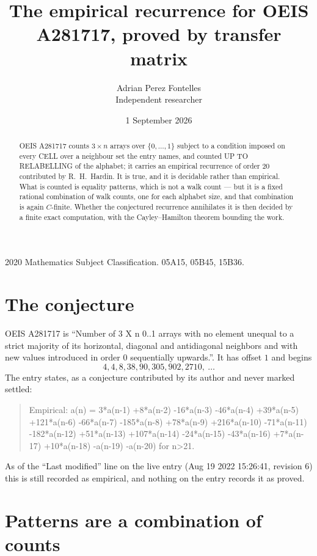 \documentclass[11pt,a4paper]{article}
\title{The empirical recurrence for OEIS A281717, proved by transfer matrix}
\author{Adrian Perez Fontelles\\ \small Independent researcher}
\date{1 September 2026}
\theoremstyle{plain}
\theoremstyle{definition}
\begin{document}
\maketitle

\begin{abstract}
OEIS A281717 counts $3\times n$ arrays over $\{0,\dots,1\}$ subject to a condition imposed on
every CELL over a neighbour set the entry names, and counted UP TO RELABELLING of the
alphabet; it carries an empirical recurrence of order $20$ contributed by
R.~H.~Hardin. It is true, and it is decidable rather than empirical. What is counted is
equality patterns, which is not a walk count --- but it is a fixed rational combination of
walk counts, one for each alphabet size, and that combination is again $C$-finite. Whether the
conjectured recurrence annihilates it is then decided by a finite exact computation, with the
Cayley--Hamilton theorem bounding the work.
\end{abstract}

\noindent\small 2020 Mathematics Subject Classification. 05A15, 05B45, 15B36.\normalsize

\section{The conjecture}

OEIS A281717 is ``Number of 3 X n 0..1 arrays with no element unequal to a strict majority of its horizontal, diagonal and antidiagonal neighbors and with new values introduced in order 0 sequentially upwards.''. It has offset $1$ and begins
\[
4, 4, 8, 38, 90, 305, 902, 2710,\ \dots
\]
The entry states, as a conjecture contributed by its author and never marked settled:
\begin{quote}
Empirical: a(n) = 3*a(n-1) +8*a(n-2) -16*a(n-3) -46*a(n-4) +39*a(n-5) +121*a(n-6) -66*a(n-7) -185*a(n-8) +78*a(n-9) +216*a(n-10) -71*a(n-11) -182*a(n-12) +51*a(n-13) +107*a(n-14) -24*a(n-15) -43*a(n-16) +7*a(n-17) +10*a(n-18) -a(n-19) -a(n-20) for n>21.
\end{quote}
As of the ``Last modified'' line on the live entry (Aug 19 2022 15:26:41, revision 6) this is still
recorded as empirical, and nothing on the entry records it as proved.

\section{Patterns are a combination of counts}
\end{document}
